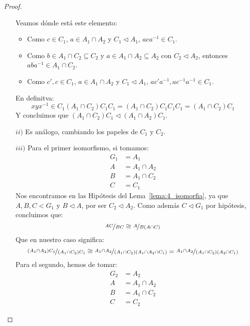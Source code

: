 \begin{teo}
\begin{proof}
\begin{enumerate}
                Veamos dónde está este elemento:
                \begin{itemize}
                    \item Como $c\in C_1$, $a\in A_1\cap A_2$ y $C_1\lhd A_1$, $aca^{-1} \in C_1$.
                    \item Como $b\in A_1\cap C_2\subseteq C_2$ y $a\in A_1\cap A_2\subseteq A_2$ con $C_2\lhd A_2$, entonces $aba^{-1}\in A_1\cap C_2$.
                    \item Como $c',c\in C_1$, $a\in A_1\cap A_2$ y $C_1\lhd A_1$, $ac'a^{-1}, ac^{-1}a^{-1}\in C_1$.
                \end{itemize}
                En definitva:
                \begin{equation*}
                    xyx^{-1} \in C_1(A_1\cap C_2)C_1C_1 = (A_1\cap C_2)C_1C_1C_1 = (A_1\cap C_2)C_1
                \end{equation*}
                Y concluimos que $(A_1\cap C_2)C_1 \lhd (A_1\cap A_2)C_1$.
            \item[$ii)$] Es análogo, cambiando los papeles de $C_1$ y $C_2$.
            \item[$iii)$] Para el primer isomorfismo, si tomamos:
                \begin{align*}
                    G_1 &= A_1 \\
                    A &= A_1\cap A_2 \\
                    B &= A_1\cap C_2 \\
                    C &= C_1
                \end{align*}
                Nos encontramos en las Hipótesis del Lema~\ref{lema:4_isomorfia}, ya que $A,B,C<G_1$ y $B\lhd A$, por ser $C_2\lhd A_2$. Como además $C\lhd G_1$ por hipótesis, concluimos que:
                \begin{equation*}
                    \nicefrac{AC}{BC} \cong \nicefrac{A}{B(A\cap C)}
                \end{equation*}
                Que en nuestro caso significa:
                \begin{equation*}
                    \nicefrac{(A_1\cap A_2)C_1}{(A_1\cap C_2)C_1} \cong \nicefrac{A_1\cap A_2}{(A_1\cap C_2)(A_1\cap A_2\cap C_1)} = \nicefrac{A_1\cap A_2}{(A_1\cap C_2)(A_2\cap C_1)} 
                \end{equation*}
                Para el segundo, hemos de tomar:
                \begin{align*}
                    G_2 &= A_2 \\
                    A &= A_1\cap A_2 \\
                    B &= A_1\cap C_2 \\
                    C &= C_2
                \end{align*}
        \end{enumerate}
    \end{proof}
\end{teo}

